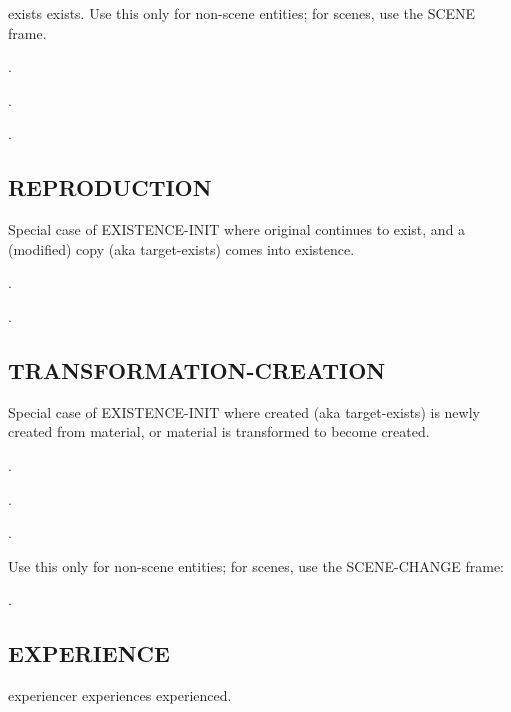 \documentclass[a4paper]{article}
\newcommand{\fr}[1]{\textsf{#1}}
\newcommand{\rl}[1]{\textsf{#1}}
\begin{document}
\rl{exists} exists. Use this only for non-scene entities; for scenes, use the \fr{SCENE} frame.

\ex.

\ex.

\ex.


\newpage\subsection{ \fr{REPRODUCTION}}
\label{sec:REPRODUCTION}

Special case of \fr{EXISTENCE-INIT} where \rl{original} continues to exist, and
a (modified) \rl{copy} (aka \rl{target-exists}) comes into existence.

\ex.

\ex.


\newpage\subsection{ \fr{TRANSFORMATION-CREATION}}
\label{sec:TRANSFORMATION-CREATION}

Special case of \fr{EXISTENCE-INIT} where \rl{created} (aka \rl{target-exists})
is newly created from \rl{material}, or \rl{material} is transformed to become
\rl{created}.

\ex.

\ex.

\ex.

Use this only for non-scene entities; for scenes, use the \fr{SCENE-CHANGE}
frame:

\ex.


\newpage\subsection{ \fr{EXPERIENCE}}
\label{sec:EXPERIENCE}

\rl{experiencer} experiences \rl{experienced}.
\end{document}
